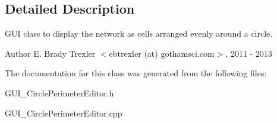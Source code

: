 \subsection{Detailed Description}
G\+U\+I class to display the network as cells arranged evenly around a circle. 

\begin{DoxyAuthor}{Author}
E. Brady Trexler $<$ebtrexler (at) gothamsci.\+com$>$, 2011 -\/ 2013 
\end{DoxyAuthor}


The documentation for this class was generated from the following files\+:\begin{DoxyCompactItemize}
\item 
G\+U\+I\+\_\+\+Circle\+Perimeter\+Editor.\+h\item 
G\+U\+I\+\_\+\+Circle\+Perimeter\+Editor.\+cpp\end{DoxyCompactItemize}

